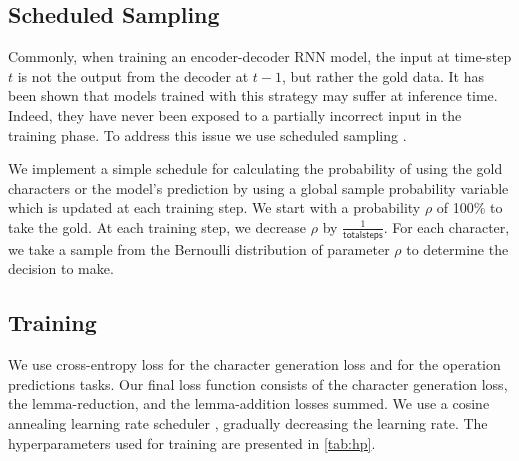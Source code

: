 \documentclass[11pt,a4paper]{article}
\newcommand\jp[1]{\textbf{JP: #1}}
\begin{document}


\subsection{Scheduled Sampling}

Commonly, when training an encoder-decoder RNN model, the input at
time-step $t$ is not the output from the decoder at $t-1$, but rather
the gold data.  It has been shown that models trained with this
strategy may suffer at inference time. Indeed, they have never been
exposed to a partially incorrect input in the training phase.  To
address this issue we use scheduled sampling
\cite{DBLP:conf/nips/BengioVJS15}.

We implement a simple schedule for calculating the probability of
using the gold characters or the model's prediction by using a global
sample probability variable which is updated at each training step. We
start with a probability \(\rho\) of 100\% to take the gold. At each
training step, we decrease \(\rho\) by
$\frac{1}{\mathsf{total steps}}$. For each character, we take a sample
from the Bernoulli distribution of parameter \(\rho\) to determine the
decision to make.

\subsection{Training}

We use cross-entropy loss for the character generation loss and for
the operation predictions tasks. Our final loss function consists of
the character generation loss, the lemma-reduction, and the
lemma-addition losses summed. We use a cosine annealing learning rate
scheduler \cite{DBLP:conf/iclr/LoshchilovH17}, gradually decreasing
the learning rate. The hyperparameters used for training are presented
in \cref{tab:hp}.
\end{document}
